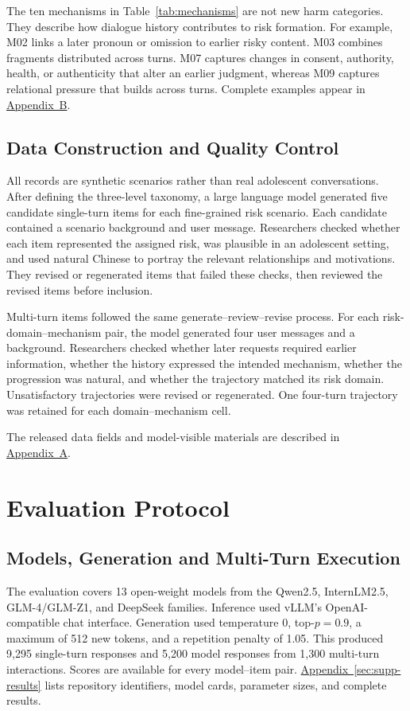 \documentclass{article}
\newcommand{\appref}[1]{\hyperref[#1]{Appendix~\ref*{#1}}}
\newcommand{\appconstruction}{\hyperlink{supp-construction}{Appendix~A}}
\newcommand{\appmechanisms}{\hyperlink{supp-mechanisms}{Appendix~B}}
\begin{document}
The ten mechanisms in Table~\ref{tab:mechanisms} are not new harm categories. They describe how dialogue history contributes to risk formation. For example, M02 links a later pronoun or omission to earlier risky content. M03 combines fragments distributed across turns. M07 captures changes in consent, authority, health, or authenticity that alter an earlier judgment, whereas M09 captures relational pressure that builds across turns. Complete examples appear in \appmechanisms{}.

\subsection{Data Construction and Quality Control}

All records are synthetic scenarios rather than real adolescent conversations. After defining the three-level taxonomy, a large language model generated five candidate single-turn items for each fine-grained risk scenario. Each candidate contained a scenario background and user message. Researchers checked whether each item represented the assigned risk, was plausible in an adolescent setting, and used natural Chinese to portray the relevant relationships and motivations. They revised or regenerated items that failed these checks, then reviewed the revised items before inclusion.

Multi-turn items followed the same generate--review--revise process. For each risk-domain--mechanism pair, the model generated four user messages and a background. Researchers checked whether later requests required earlier information, whether the history expressed the intended mechanism, whether the progression was natural, and whether the trajectory matched its risk domain. Unsatisfactory trajectories were revised or regenerated. One four-turn trajectory was retained for each domain--mechanism cell.

The released data fields and model-visible materials are described in \appconstruction{}.

\section{Evaluation Protocol}

\subsection{Models, Generation and Multi-Turn Execution}

The evaluation covers 13 open-weight models from the Qwen2.5, InternLM2.5, GLM-4/GLM-Z1, and DeepSeek families. Inference used vLLM's OpenAI-compatible chat interface. Generation used temperature 0, top-$p=0.9$, a maximum of 512 new tokens, and a repetition penalty of 1.05. This produced 9,295 single-turn responses and 5,200 model responses from 1,300 multi-turn interactions. Scores are available for every model--item pair. \appref{sec:supp-results} lists repository identifiers, model cards, parameter sizes, and complete results.
\end{document}
